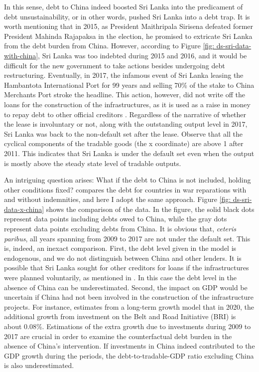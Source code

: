 In this sense, debt to China indeed boosted Sri Lanka into the predicament of debt unsustainability, or in other words, pushed Sri Lanka into a debt trap.
It is worth mentioning that in 2015, as President Maithripala Sirisena defeated former President Mahinda Rajapaksa in the election, he promised to extricate Sri Lanka from the debt burden from China. However, according to Figure \ref{fig: ds-sri-data-with-china}, Sri Lanka was too indebted during 2015 and 2016, and it would be difficult for the new government to take actions besides undergoing debt restructuring. Eventually, in 2017, the infamous event of Sri Lanka leasing the Hambantota International Port for 99 years and selling 70\% of the stake to China Merchants Port stroke the headline. This action, however, did not write off the loans for the construction of the infrastructures, as it is used as a raise in money to repay debt to other official creditors \citep{Brautigam-meme-2020, Moramudali_2019}. Regardless of the narrative of whether the lease is involuntary or not, along with the outstanding output level in 2017, Sri Lanka was back to the non-default set after the lease.
Observe that all the cyclical components of the tradable goods (the x coordinate) are above 1 after 2011. This indicates that Sri Lanka is under the default set even when the output is mostly above the steady state level of tradable outputs.

An intriguing question arises: What if the debt to China is not included, holding other conditions fixed? \citet{Hinrichsen_2020-chapter4} compares the debt for countries in war reparations with and without indemnities, and here I adopt the same approach. Figure \ref{fig: ds-sri-data-x-china} shows the comparison of the data. In the figure, the solid black dots represent data points including debts owed to China, while the gray dots represent data points excluding debts from China.
It is obvious that, \emph{ceteris paribus}, all years spanning from 2009 to 2017 are not under the default set. This is, indeed, an inexact comparison.
First, the debt level given in the model is endogenous, and we do not distinguish between China and other lenders. It is possible that Sri Lanka sought for other creditors for loans if the infrastructures were planned voluntarily, as mentioned in \citet{Brautigam-meme-2020}. In this case the debt level in the absence of China can be underestimated.
Second, the impact on GDP would be uncertain if China had not been involved in the construction of the infrastructure projects. For instance, \citet{Bandiera-Vasileios-BRI-debt} estimates from a long-term growth model that in 2020, the additional growth from investment on the Belt and Road Initiative (BRI) is about 0.08\%.
Estimations of the extra growth due to investments during 2009 to 2017 are crucial in order to examine the counterfactual debt burden in the absence of China's intervention. If investments in China indeed contributed to the GDP growth during the periods, the debt-to-tradable-GDP ratio excluding China is also underestimated.

